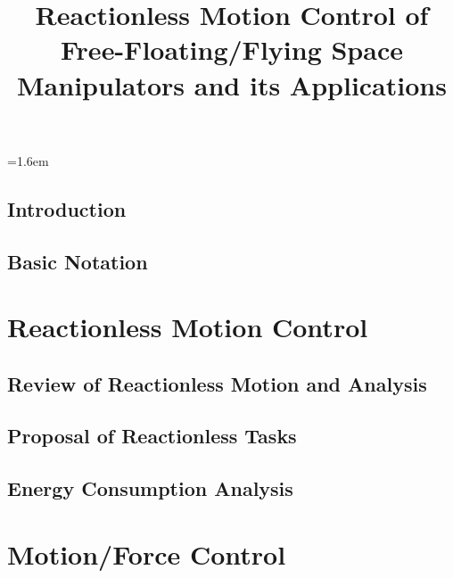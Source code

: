 \documentclass[12pt]{book}
\title{
  {\LARGE\bf
    Reactionless Motion Control of Free-Floating/Flying Space Manipulators and its Applications
  }
}
\author{\cover}
\date{
  \dateofsubmission
}
\begin{document}
\baselineskip=1.6em
\parindent=12pt

\pagestyle{empty}
\maketitle

%
\pagestyle{headings}
%
%
\setcounter{page}{1}
%
%
\tableofcontents
%
%
\listoffigures
\listoftables



\chapter{Introduction}
\label{cha:INTRO}


\chapter{Basic Notation}
\label{cha:BASIC}


\part{Reactionless Motion Control}
\chapter{Review of Reactionless Motion and Analysis}
\label{cha:ANALYSIS}


\chapter{Proposal of Reactionless Tasks}
\label{cha:PROPOSAL}


\chapter{Energy Consumption Analysis}
\label{cha:ENERGY}


\part{Motion/Force Control}
\end{document}
